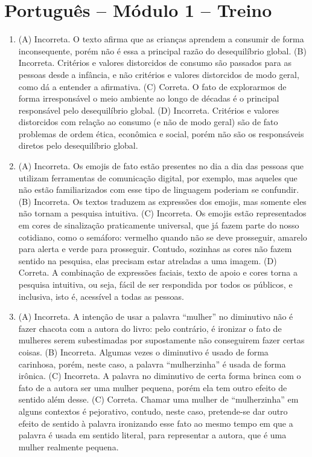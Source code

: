 \pagebreak
\pagestyle{plain}
\footnotesize

\pagecolor{gray!40}

\section*{Português – Módulo 1 – Treino}

\begin{enumerate}
\item (A) Incorreta. O texto afirma que as crianças aprendem a consumir de forma inconsequente, porém não é essa a principal razão do desequilíbrio global.
(B) Incorreta. Critérios e valores distorcidos de consumo são passados para as pessoas desde a infância, e não critérios e valores distorcidos de modo geral, como dá a entender a afirmativa.
(C) Correta. O fato de explorarmos de forma irresponsável o meio ambiente ao longo de décadas é o principal responsável pelo desequilíbrio global.
(D) Incorreta. Critérios e valores distorcidos com relação ao consumo (e não de modo geral) são de fato problemas de ordem ética, econômica e social, porém não são os responsáveis diretos pelo desequilíbrio global.

\item (A) Incorreta. Os emojis de fato estão presentes no dia a dia das pessoas
que utilizam ferramentas de comunicação digital, por exemplo, mas
aqueles que não estão familiarizados com esse tipo de linguagem poderiam
se confundir.
(B) Incorreta. Os textos traduzem as expressões dos emojis, mas somente
eles não tornam a pesquisa intuitiva.
(C) Incorreta. Os emojis estão representados em cores de sinalização
praticamente universal, que já fazem parte do nosso cotidiano, como o
semáforo: vermelho quando não se deve prosseguir, amarelo para alerta e
verde para prosseguir. Contudo, sozinhas as cores não fazem sentido na
pesquisa, elas precisam estar atreladas a uma imagem.
(D) Correta. A combinação de expressões faciais, texto de apoio e cores
torna a pesquisa intuitiva, ou seja, fácil de ser respondida por todos
os públicos, e inclusiva, isto é, acessível a todas as pessoas.

\item (A) Incorreta. A intenção de usar a palavra ``mulher'' no diminutivo não
é fazer chacota com a autora do livro: pelo contrário, é ironizar o fato
de mulheres serem subestimadas por supostamente não conseguirem fazer
certas coisas.
(B) Incorreta. Algumas vezes o diminutivo é usado de forma carinhosa,
porém, neste caso, a palavra ``mulherzinha'' é usada de forma irônica.
(C) Incorreta. A palavra no diminutivo de certa forma brinca com o fato
de a autora ser uma mulher pequena, porém ela tem outro efeito de
sentido além desse.
(C) Correta. Chamar uma mulher de ``mulherzinha'' em alguns contextos é
pejorativo, contudo, neste caso, pretende-se dar outro efeito de sentido
à palavra ironizando esse fato ao mesmo tempo em que a palavra é usada
em sentido literal, para representar a autora, que é uma mulher
realmente pequena.
\end{enumerate}

